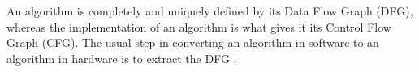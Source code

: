 An algorithm is completely and uniquely defined by its Data Flow Graph
(DFG), whereas the implementation of an algorithm is what gives it its
Control Flow Graph (CFG). The usual step in converting an algorithm in
software to an algorithm in hardware is to extract the DFG
\cite{Schaumont}.

%
%
%
